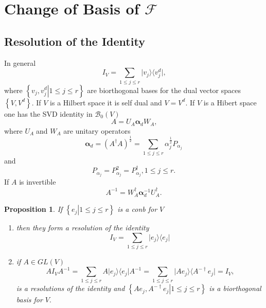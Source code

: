 \documentclass[aps, preprint]{revtex4}
\newtheorem{proposition}[theorem]{Proposition}
\begin{document}
\section{Change of Basis of $\mathcal{F}$}


\subsection{Resolution of the Identity}
In general
\begin{equation}I_{V} =\sum _{1 \leq j \leq r}\vert v_{j} \rangle  \langle v_{j}^{d}\vert \text{,}
\end{equation}where $\left \{\left .v_{j} ,v_{j}^{d}\right \vert 1 \leq j \leq r\right \}$ are biorthogonal bases for the dual vector spaces $\left \{V ,V^{d}\right \}$. If $V$ is a Hilbert space it is self dual and $V =V^{d}$. If $V$ is a Hibert space one has the SVD identity in $\mathcal{B}_{0} \left (V\right )$
\begin{equation}A =U_{A} \mathbf{\alpha }_{d} W_{A}\text{,}
\end{equation}where $U_{A}\;$and $W_{A}$ are unitary operators
\begin{equation}\mathbf{\alpha }_{d} =\left (A^{ \dag } A\right )^{\frac{1}{2}} =\sum _{1 \leq j \leq r}\alpha _{j}^{\frac{1}{2}} P_{\alpha _{j}}
\end{equation}and
\begin{equation}P_{\alpha _{j}} =P_{\alpha _{j}}^{2} =P_{\alpha _{j}}^{ \dag } ,1 \leq j \leq r\text{.}
\end{equation}If $A$ is invertible
\begin{equation}A^{ -1} =W_{A}^{ \dag } \mathbf{\alpha }_{d}^{ -1} U_{A}^{ \dag }\text{.}
\end{equation}


\begin{proposition}
If $\left \{\left .e_{j}\right \vert 1 \leq j \leq r\right \}$ is a conb for $V$\emph{\ } 


\begin{enumerate}
\item then they form a resolution of the identity
\begin{equation}I_{V} =\sum _{1 \leq j \leq r}\vert e_{j} \rangle  \langle e_{j}\vert 
\end{equation}

\item if $A \in G L \left (V\right )$
\begin{equation}A I_{V} A^{ -1} =\sum _{1 \leq j \leq r}A\vert e_{j} \rangle  \langle e_{j}\vert A^{ -1} =\sum _{1 \leq j \leq r}\vert A e_{j} \rangle  \langle A^{ - \dag } e_{j}\vert  =I_{V}\text{,}
\end{equation}is a resolutions of the identity and $\left \{\left .A e_{j} ,A^{ - \dag } e_{j}\right \vert 1 \leq j \leq r\right \}$ is a \emph{biorthogonal basis} for $V\text{.}$ \end{enumerate}
\end{proposition}
\end{document}

